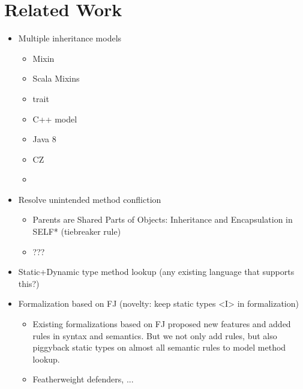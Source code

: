 \section{Related Work}

\begin{itemize}
	\item Multiple inheritance models
		\begin{itemize}
			\item Mixin
			\item Scala Mixins
			\item trait
			\item C++ model
			\item Java 8
			\item CZ
			\item {}
		\end{itemize}
	\item Resolve unintended method confliction
		\begin{itemize}
			\item Parents are Shared Parts of Objects: Inheritance and Encapsulation in SELF* (tiebreaker rule)
			\item ???
		\end{itemize}
	\item Static+Dynamic type method lookup (any existing language that supports this?)
	\item Formalization based on FJ (novelty: keep static types <I> in formalization)
		\begin{itemize}
			\item Existing formalizations based on FJ proposed new features and added rules in syntax and semantics. But we not only add rules, but also piggyback static types on almost all semantic rules to model method lookup. 
			\item Featherweight defenders, ...
		\end{itemize}
\end{itemize}